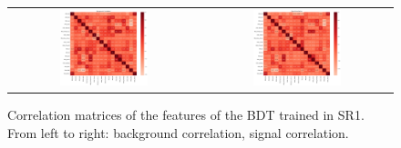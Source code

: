 \begin{figure}[tbh!]
 \begin{center}
 \begin{tabular}{cc}
 \includegraphics[width=0.48\textwidth]{figures/Part3/BDT/corr_bkg_SR1}&
 \includegraphics[width=0.48\textwidth]{figures/Part3/BDT/corr_signal_SR1}\\
 \end{tabular}
 \caption{Correlation matrices of the features of the \ac{BDT} trained in \ac{SR}1. From left to right: background correlation, signal correlation.}
 \label{fig:Corr1}
 \end{center}
\end{figure}

